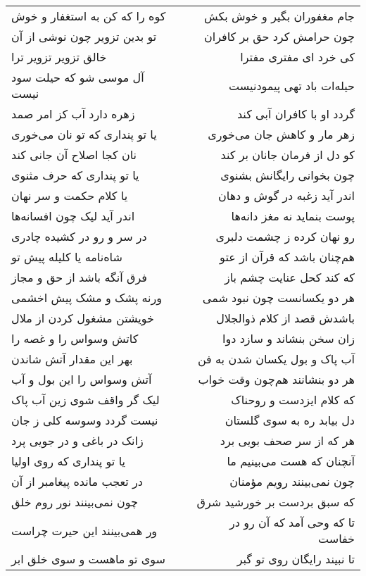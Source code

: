 \begin{center}
\begin{longtable}{l p{0.5cm} r}
\\
کوه را که کن به استغفار و خوش
&&
جام مغفوران بگیر و خوش بکش
\\
تو بدین تزویر چون نوشی از آن
&&
چون حرامش کرد حق بر کافران
\\
خالق تزویر تزویر ترا
&&
کی خرد ای مفتری مفترا
\\
آل موسی شو که حیلت سود نیست
&&
حیله‌ات باد تهی پیمودنیست
\\
زهره دارد آب کز امر صمد
&&
گردد او با کافران آبی کند
\\
یا تو پنداری که تو نان می‌خوری
&&
زهر مار و کاهش جان می‌خوری
\\
نان کجا اصلاح آن جانی کند
&&
کو دل از فرمان جانان بر کند
\\
یا تو پنداری که حرف مثنوی
&&
چون بخوانی رایگانش بشنوی
\\
یا کلام حکمت و سر نهان
&&
اندر آید زغبه در گوش و دهان
\\
اندر آید لیک چون افسانه‌ها
&&
پوست بنماید نه مغز دانه‌ها
\\
در سر و رو در کشیده چادری
&&
رو نهان کرده ز چشمت دلبری
\\
شاه‌نامه یا کلیله پیش تو
&&
هم‌چنان باشد که قرآن از عتو
\\
فرق آنگه باشد از حق و مجاز
&&
که کند کحل عنایت چشم باز
\\
ورنه پشک و مشک پیش اخشمی
&&
هر دو یکسانست چون نبود شمی
\\
خویشتن مشغول کردن از ملال
&&
باشدش قصد از کلام ذوالجلال
\\
کاتش وسواس را و غصه را
&&
زان سخن بنشاند و سازد دوا
\\
بهر این مقدار آتش شاندن
&&
آب پاک و بول یکسان شدن به فن
\\
آتش وسواس را این بول و آب
&&
هر دو بنشانند هم‌چون وقت خواب
\\
لیک گر واقف شوی زین آب پاک
&&
که کلام ایزدست و روحناک
\\
نیست گردد وسوسه کلی ز جان
&&
دل بیابد ره به سوی گلستان
\\
زانک در باغی و در جویی پرد
&&
هر که از سر صحف بویی برد
\\
یا تو پنداری که روی اولیا
&&
آنچنان که هست می‌بینیم ما
\\
در تعجب مانده پیغامبر از آن
&&
چون نمی‌بینند رویم مؤمنان
\\
چون نمی‌بینند نور روم خلق
&&
که سبق بردست بر خورشید شرق
\\
ور همی‌بینند این حیرت چراست
&&
تا که وحی آمد که آن رو در خفاست
\\
سوی تو ماهست و سوی خلق ابر
&&
تا نبیند رایگان روی تو گبر
\\

\end{longtable}
\end{center}
